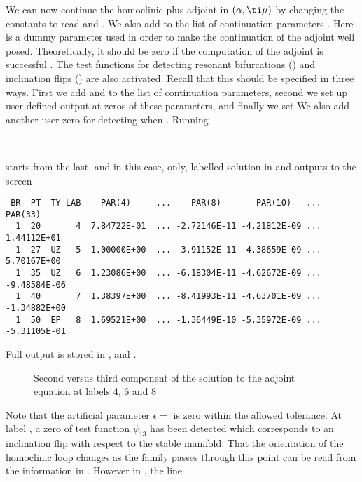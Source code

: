 \documentclass[12pt]{report}
\begin{document}
We can now continue the homoclinic plus
adjoint in $(\alpha,\ti \mu)$  by
changing the constants to read
 and .
We also add  to the list of continuation parameters
. Here  is a dummy parameter used in
order to make the continuation of the adjoint well posed. Theoretically,
it should be zero if the computation of the adjoint is successful
\cite{Sa:95b}.
The test functions for detecting resonant bifurcations 
() and inclination flips () are
also activated. Recall that this should be specified in
three ways. First we add  and 
to the list of continuation parameters, second we set up user defined
output at zeros of these parameters, and finally we set 
We also add another user zero for detecting when .
Running 
\begin{center}
\\
\end{center}
starts from the last, and in this case, only, labelled solution in 
and outputs to the screen
\begin{verbatim}
 BR  PT  TY LAB    PAR(4)     ...    PAR(8)       PAR(10)   ...    PAR(33)    
  1  20       4  7.84722E-01  ... -2.72146E-11 -4.21812E-09 ...  1.44112E+01
  1  27  UZ   5  1.00000E+00  ... -3.91152E-11 -4.38659E-09 ...  5.70167E+00
  1  35  UZ   6  1.23086E+00  ... -6.18304E-11 -4.62672E-09 ... -9.48584E-06
  1  40       7  1.38397E+00  ... -8.41993E-11 -4.63701E-09 ... -1.34882E+00
  1  50  EP   8  1.69521E+00  ... -1.36449E-10 -5.35972E-09 ... -5.31105E-01
\end{verbatim}
Full output is stored in ,  and . 
\begin{figure}[b]
\epsfysize 9.0cm
\centerline{}
\caption{Second versus third component of the solution to the adjoint
equation at labels 4, 6 and 8}
\label{Ftest1}
\end{figure}
Note that the artificial parameter $\epsilon=$ is zero within
the allowed tolerance. At label , a zero of test function $\psi_{13}$ has
been detected which corresponds to an inclination flip with respect to
the stable manifold. That the orientation of the homoclinic loop
changes as the family passes through this point can be read from
the information in .
However in , the line 
\end{document}
